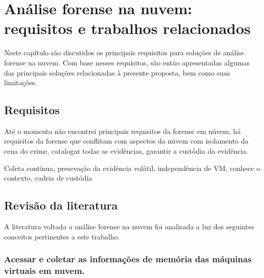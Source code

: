 \documentclass[
	12pt,				%
	openright,			%
	oneside,			%
	a4paper,			%
	english,			%
	brazil,				%
	]{abntex2}
\newcommand{\marcos}[1]{{\color{blue}{MARCOS: #1}}}
\begin{document}
\chapter{Análise forense na nuvem: requisitos e trabalhos relacionados}
\label{chp:contexto}

\marcos{Precisa de um texto introdutório aqui. Estou deixando uma sugestão inicial}

Neste capítulo são discutidos os principais requisitos para soluções de análise forense na nuvem.
%
Com base nesses requisitos, são então apresentadas algumas das principais soluções relacionadas à presente proposta, bem como suas limitações.

\section{Requisitos}
\label{chp:contexto-requisitos}

\marcos{Discuta aqui as métricas que você vai utilizar para a comparação e o porquê delas serem relevantes. Isso define os requisitos para soluções relacionadas, e permite você analisá-las e justificar a sua solução.}
Até o momento não encontrei principais requisitos da forense em núvem, há requisitos da forense que conflitam com aspectos da núvem com isolamento da cena do crime, catalogar
todas as evidências, garantir a custôdia da evidência.

Coleta contínua, presevação da evidência volátil, independência de VM, conhece o contexto, cadeia de custódia

\section{Revisão da literatura}
\label{chp:contexto-revisao}

A literatura voltada a análise forense na nuvem foi analisada a luz dos seguintes conceitos pertinentes a este trabalho. 

\subsection{Acessar e coletar as informações de memória das máquinas virtuais em nuvem.}
\label{chp:coleta-revisao}
\end{document}
